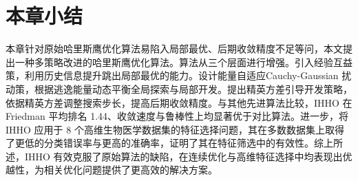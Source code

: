 \documentclass{wzuthesis}
\begin{document}





\section{本章小结}
本章针对原始哈里斯鹰优化算法易陷入局部最优、后期收敛精度不足等问，本文提出一种多策略改进的哈里斯鹰优化算法。算法从三个层面进行增强。引入经验互益策，利用历史信息提升跳出局部最优的能力。设计能量自适应Cauchy-Gaussian 扰动策，根据逃逸能量动态平衡全局探索与局部开发。提出精英方差引导开发策略，依据精英方差调整搜索步长，提高后期收敛精度。与其他先进算法比较，IHHO 在 Friedman 平均排名 1.44、收敛速度与鲁棒性上均显著优于对比算法。进一步，将 IHHO 应用于 8 个高维生物医学数据集的特征选择问题，其在多数数据集上取得了更低的分类错误率与更高的准确率，证明了其在特征筛选中的有效性。综上所述，IHHO 有效克服了原始算法的缺陷，在连续优化与高维特征选择中均表现出优越性，为相关优化问题提供了更高效的解决方案。
\end{document}
